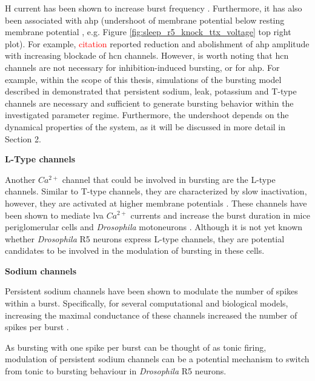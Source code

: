\documentclass[../main.tex]{subfiles}
\begin{document}
H current has been shown to increase burst frequency \cite{liuMultipleConductancesCooperatively2008,mccormickModelElectrophysiologicalProperties1992}.
Furthermore, it has also been associated with \gls{ahp} (undershoot of membrane potential below resting membrane potential \cite{mccormickModelElectrophysiologicalProperties1992}, e.g. Figure \ref{fig:sleep_r5_knock_ttx_voltage} top right plot). For example, \textcolor{red}{citation} reported reduction and abolishment of \gls{ahp} amplitude with increasing blockade of \gls{hcn} channels.
However, is worth noting that \gls{hcn} channels are not necessary for inhibition-induced bursting,
or for \gls{ahp}. For example, within the scope of this thesis, simulations of the bursting model described in \cite{wangMultipleDynamicalModes1994}
demonstrated that persistent sodium, leak, potassium and T-type channels are necessary and sufficient to generate bursting behavior within the investigated parameter regime.
Furthermore, the undershoot depends on the dynamical properties of the system, as it will be discussed in more detail in Section 2. %

\noindent\textbf{L-Type channels}

Another $Ca^{2+}$ channel that could be involved in bursting are the L-type channels. Similar to T-type channels, they are characterized by slow inactivation, however, they are activated at higher membrane potentials \cite{liuMultipleConductancesCooperatively2008}.
These channels have been shown to mediate \gls{lva} $Ca^{2+}$ currents and increase the burst duration in mice periglomerular cells \cite{liuMultipleConductancesCooperatively2008} and \textit{Drosophila} motoneurons \cite{kadasDendriticAxonalLType2017}.
Although it is not yet known whether \textit{Drosophila} R5 neurons express L-type channels, they are potential candidates to be involved in the modulation of bursting in these cells.


\noindent\textbf{Sodium channels}

Persistent sodium channels have been shown to modulate the number of spikes within a burst. Specifically, for several computational and biological models, increasing the maximal conductance of these channels increased the number of spikes per burst \cite{liuMultipleConductancesCooperatively2008,golombContributionPersistentNa2006}.

As bursting with one spike per burst can be thought of as tonic firing, modulation of persistent sodium channels can be a potential mechanism to switch from tonic to bursting behaviour in \textit{Drosophila} R5 neurons.
\end{document}
